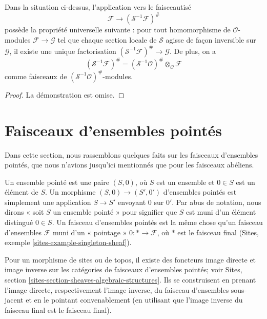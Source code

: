 \begin{lemma}
\label{lemma-simple-invert-module}
Dans la situation ci-dessus, l'application vers le faisceautisé
$$
\mathcal{F} \longrightarrow (\mathcal{S}^{-1}\mathcal{F})^\#
$$
possède la propriété universelle suivante : pour tout homomorphisme de
$\mathcal{O}$-modules $\mathcal{F} \to \mathcal{G}$ tel que chaque section
locale de $\mathcal{S}$ agisse de façon inversible sur $\mathcal{G}$, il
existe une unique factorisation
$(\mathcal{S}^{-1}\mathcal{F})^\# \to \mathcal{G}$. De plus, on a
$$
(\mathcal{S}^{-1}\mathcal{F})^\#
=
(\mathcal{S}^{-1}\mathcal{O})^\# \otimes_\mathcal{O} \mathcal{F}
$$
comme faisceaux de $(\mathcal{S}^{-1}\mathcal{O})^\#$-modules.
\end{lemma}

\begin{proof}
La démonstration est omise.
\end{proof}









\section{Faisceaux d'ensembles pointés}
\label{section-pointed}

\noindent
Dans cette section, nous rassemblons quelques faits sur les faisceaux
d'ensembles pointés, que nous n'avions jusqu'ici mentionnés que pour les
faisceaux abéliens.

\medskip\noindent
Un ensemble pointé est une paire $(S, 0)$, où $S$ est un ensemble et
$0 \in S$ est un élément de $S$. Un morphisme $(S, 0) \to (S', 0')$ d'ensembles pointés est simplement
une application $S \to S'$ envoyant $0$ sur $0'$. Par abus de notation, nous
dirons « soit $S$ un ensemble pointé » pour signifier que $S$ est muni d'un
élément distingué $0 \in S$. Un faisceau d'ensembles pointés est la même chose
qu'un faisceau d'ensembles $\mathcal{F}$ muni d'un « pointage »
$0 : * \to \mathcal{F}$, où $*$ est le faisceau final
(Sites, exemple \ref{sites-example-singleton-sheaf}).

\medskip\noindent
Pour un morphisme de sites ou de topos, il existe des foncteurs image directe
et image inverse sur les catégories de faisceaux d'ensembles pointés; voir
Sites, section \ref{sites-section-sheaves-algebraic-structures}. Ils se
construisent en prenant l'image directe, respectivement l'image inverse, du
faisceau d'ensembles sous-jacent et en le pointant convenablement (en utilisant
que l'image inverse du faisceau final est le faisceau final).

